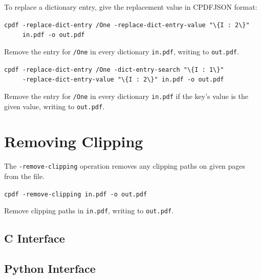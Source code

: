 \documentclass{book}
\begin{document}
\noindent To replace a dictionary entry, give the replacement value in CPDFJSON format:

  \begin{framed}
  \small\noindent\verb!cpdf -replace-dict-entry /One -replace-dict-entry-value "\{I : 2\}"!\\
  \small\noindent\verb!     in.pdf -o out.pdf!

  \vspace{2.5mm}
  \noindent Remove the entry for \texttt{/One} in every dictionary \texttt{in.pdf}, writing to \texttt{out.pdf}. 

  \vspace{2.5mm}

  \small\noindent\verb!cpdf -replace-dict-entry /One -dict-entry-search "\{I : 1\}"!\\
  \small\noindent\verb!     -replace-dict-entry-value "\{I : 2\}" in.pdf -o out.pdf!

  \vspace{2.5mm}
  \noindent Remove the entry for \texttt{/One} in every dictionary \texttt{in.pdf} if the key's value is the given value, writing to \texttt{out.pdf}. 
  \end{framed}

\section{Removing Clipping}


The \texttt{-remove-clipping} operation removes any clipping paths on given pages from the file.

  \begin{framed}
  \small\noindent\verb!cpdf -remove-clipping in.pdf -o out.pdf!

  \vspace{2.5mm}
  \noindent Remove clipping paths in \texttt{in.pdf}, writing to \texttt{out.pdf}. 
  \end{framed}

\begin{cpdflib}
\clearpage
\section*{C Interface}
\begin{small}\tt

\end{small}
\end{cpdflib}

\begin{pycpdflib}
\clearpage
\section*{Python Interface}
\begin{small}\tt

\end{small}
\end{pycpdflib}
\end{document}
